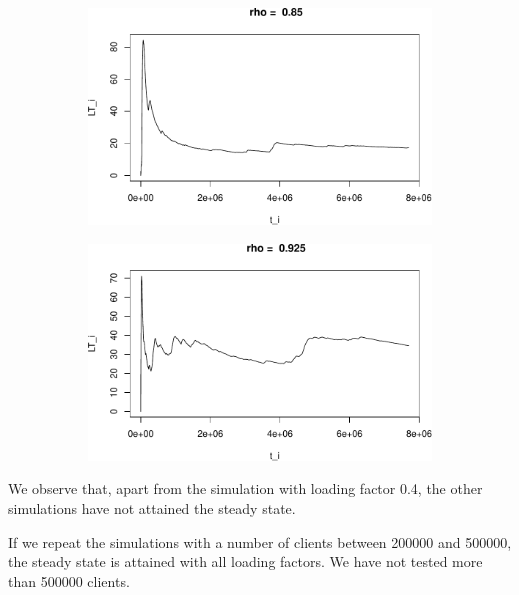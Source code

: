 \documentclass[]{article}
\begin{document}
\begin{figure}[h!]
\begin{subfigure}[b]{.55\linewidth}
\includegraphics[width=\linewidth]{003_files/figure-latex/unnamed-chunk-10-3.pdf}
\end{subfigure}\hfill
\begin{subfigure}[b]{.55\linewidth}
\includegraphics[width=\linewidth]{003_files/figure-latex/unnamed-chunk-10-4.pdf}
\end{subfigure}\vfill
\end{figure}





We observe that, apart from the simulation with loading factor 0.4, the
other simulations have not attained the steady state.

If we repeat the simulations with a number of clients between 200000 and
500000, the steady state is attained with all loading factors. We have
not tested more than 500000 clients.
\end{document}
